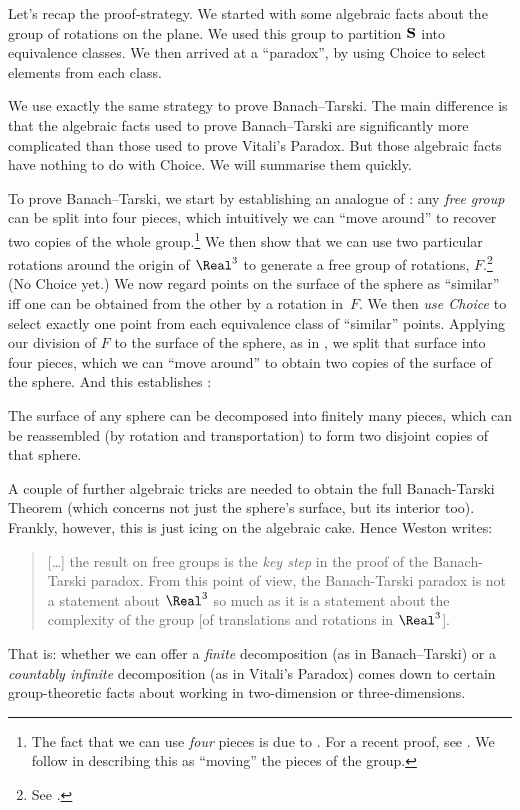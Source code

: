 \documentclass[../../../include/open-logic-section]{subfiles}
\begin{document}
Let's recap the proof-strategy. We started with some algebraic facts
about the group of rotations on the plane. We used this group to
partition $\mathbf{S}$ into equivalence classes. We then arrived at a
``paradox'', by using Choice to select elements from each class.

We use exactly the same strategy to prove Banach--Tarski. The main
difference is that the algebraic facts used to prove Banach--Tarski
are significantly more complicated than those used to prove
Vitali's Paradox. But those algebraic facts have nothing to do with
Choice. We will summarise them quickly. 

To prove Banach--Tarski, we start by establishing an analogue of
: any \emph{free group} can be split into four
pieces, which intuitively we can ``move around'' to recover two copies
of the whole group.\footnote{The fact that we can use \emph{four}
pieces is due to \cite{Robinson1947}. For a recent proof, see
\citet[Theorem 5.2]{Wagon2016}. We follow \citet[p.~3]{Weston2003}
in describing this as ``moving'' the pieces of the group.} We then
show that we can use two particular rotations around the origin of
$\Real^3$ to generate a free group of rotations, $F$.\footnote{See
\citet[Theorem 2.1]{Wagon2016}.} (No Choice yet.) We now regard points
on the surface of the sphere as ``similar'' iff one can be obtained
from the other by a rotation in~$F$. We then \emph{use Choice} to
select exactly one point from each equivalence class of ``similar''
points. Applying our division of $F$ to the surface of the sphere, as
in , we split that surface into four pieces,
which we can ``move around'' to obtain two copies of the surface of
the sphere. And this establishes \citep{Hausdorff1914}:

\begin{thm} 
The surface of any sphere can be decomposed into finitely many pieces,
which can be reassembled (by rotation and transportation) to form two
disjoint copies of that sphere.
\end{thm}

A couple of further algebraic tricks are needed to obtain the full
Banach-Tarski Theorem (which concerns not just the sphere's surface,
but its interior too). Frankly, however, this is just icing on the
algebraic cake. Hence Weston writes:
\begin{quote}	
  [\ldots] the result on free groups is the \emph{key step} in the
  proof of the Banach-Tarski paradox. From this point of view, the
  Banach-Tarski paradox is not a statement about $\Real^3$ so much as
  it is a statement about the complexity of the group [of translations
  and rotations in $\Real^3$]. \cite[p.~16]{Weston2003}
\end{quote}
That is: whether we can offer a \emph{finite} decomposition (as in
Banach--Tarski) or a \emph{countably infinite} decomposition (as in
Vitali's Paradox) comes down to certain group-theoretic facts about
working in two-dimension or three-dimensions.
\end{document}

